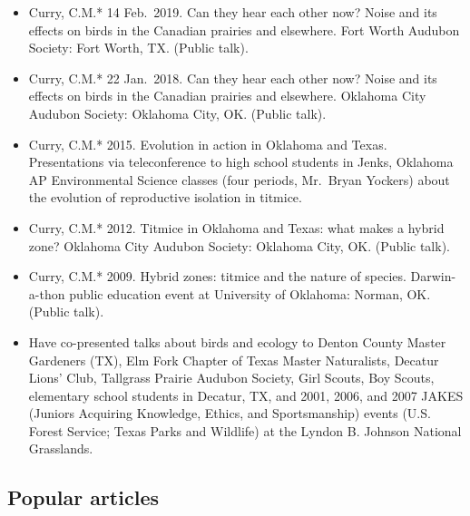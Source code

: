 \documentclass[
  letterpaper,
  DIV=11,
  numbers=noendperiod,
  oneside]{scrreprt}
\providecommand{\tightlist}{%
  \setlength{\itemsep}{0pt}\setlength{\parskip}{0pt}}\usepackage{longtable,booktabs,array}
\begin{document}
\begin{itemize}
\tightlist
\item
  Curry, C.M.* 14 Feb.~2019. Can they hear each other now? Noise and its
  effects on birds in the Canadian prairies and elsewhere. Fort Worth
  Audubon Society: Fort Worth, TX. (Public talk).
\item
  Curry, C.M.* 22 Jan.~2018. Can they hear each other now? Noise and its
  effects on birds in the Canadian prairies and elsewhere. Oklahoma City
  Audubon Society: Oklahoma City, OK. (Public talk).
\item
  Curry, C.M.* 2015. Evolution in action in Oklahoma and Texas.
  Presentations via teleconference to high school students in Jenks,
  Oklahoma AP Environmental Science classes (four periods, Mr.~Bryan
  Yockers) about the evolution of reproductive isolation in titmice.
\item
  Curry, C.M.* 2012. Titmice in Oklahoma and Texas: what makes a hybrid
  zone? Oklahoma City Audubon Society: Oklahoma City, OK. (Public talk).
\item
  Curry, C.M.* 2009. Hybrid zones: titmice and the nature of species.
  Darwin-a-thon public education event at University of Oklahoma:
  Norman, OK. (Public talk).
\item
  Have co-presented talks about birds and ecology to Denton County
  Master Gardeners (TX), Elm Fork Chapter of Texas Master Naturalists,
  Decatur Lions' Club, Tallgrass Prairie Audubon Society, Girl Scouts,
  Boy Scouts, elementary school students in Decatur, TX, and 2001, 2006,
  and 2007 JAKES (Juniors Acquiring Knowledge, Ethics, and
  Sportsmanship) events (U.S. Forest Service; Texas Parks and Wildlife)
  at the Lyndon B. Johnson National Grasslands.
\end{itemize}

\subsection{Popular articles}\label{popular-articles}
\end{document}
